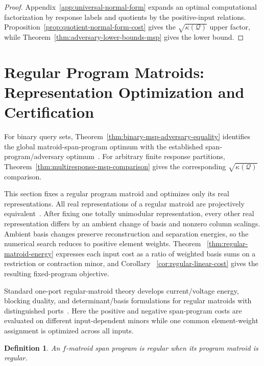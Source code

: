 \documentclass[11pt]{article}
\numberwithin{equation}{section}
\newtheorem{definition}{Definition}[section]
\theoremstyle{remark}
\begin{document}
\begin{proof}
Appendix~\ref{app:universal-normal-form} expands an optimal computational
factorization by response labels and quotients by the positive-input
relations. Proposition~\ref{prop:quotient-normal-form-cost} gives the
$\sqrt{\kappa(\mathcal Q)}$ upper factor, while
Theorem~\ref{thm:adversary-lower-bounds-msp} gives the lower bound.
\end{proof}


\section{Regular Program Matroids: Representation Optimization and Certification}
\label{sec:regular-matroid-optimization}

For binary query sets,
Theorem~\ref{thm:binary-msp-adversary-equality} identifies the global
matroid-span-program optimum with the established span-program/adversary
optimum~\cite{Reichardt2009,Reichardt2014Equivalent}. For arbitrary finite
response partitions, Theorem~\ref{thm:multiresponse-msp-comparison} gives the
corresponding $\sqrt{\kappa(\mathcal Q)}$ comparison.

This section fixes a regular program matroid and optimizes only its real
representations. All real representations of a regular matroid are
projectively equivalent~\cite{BrylawskiLucas1976,Oxley2011}. After fixing one
totally unimodular representation, every other real representation differs
by an ambient change of basis and nonzero column scalings. Ambient basis
changes preserve reconstruction and separation energies, so the numerical
search reduces to positive element weights. Theorem
~\ref{thm:regular-matroid-energy} expresses each input cost as a ratio of
weighted basis sums on a restriction or contraction minor, and Corollary
~\ref{cor:regular-linear-cost} gives the resulting fixed-program objective.

Standard one-port regular-matroid theory develops current/voltage energy,
blocking duality, and determinant/basis formulations for regular matroids
with distinguished ports~\cite{Chaiken1987,Chaiken2006PortedTutte}. Here the
positive and negative span-program costs are evaluated on different
input-dependent minors while one common element-weight assignment is
optimized across all inputs.

\begin{definition}
\label{def:regular-matroid-span-program}
An $f$-matroid span program is \emph{regular} when its program matroid is
regular.
\end{definition}
\end{document}
